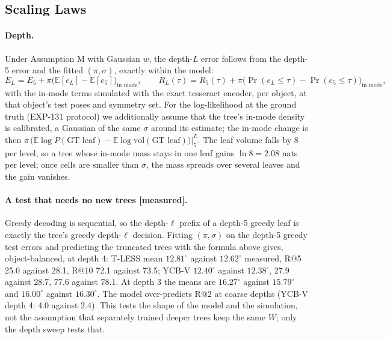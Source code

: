 \subsection{Scaling Laws}
\label{sec:supp_theory_scaling}

\paragraph{Depth.}
Under Assumption M with Gaussian $w$, the depth-$L$ error follows from the depth-5 error and the fitted $(\pi,\sigma)$, exactly
within the model:
\[
E_L=E_5+\pi\big(\mathbb E[e_L]-\mathbb E[e_5]\big)_{\text{in mode}},\qquad
R_L(\tau)=R_5(\tau)+\pi\big(\Pr(e_L\le\tau)-\Pr(e_5\le\tau)\big)_{\text{in mode}},
\]
with the in-mode terms simulated with the exact tesseract encoder, per object, at that object's test poses and symmetry set.
For the log-likelihood at the ground truth (EXP-131 protocol) we additionally assume that the tree's in-mode density is calibrated, a Gaussian of the
same $\sigma$ around its estimate; the in-mode change is then $\pi\,\big(\mathbb E\log P(\text{GT leaf})-\mathbb E\log\mathrm{vol}(\text{GT leaf})\big)\big|^{L}_{5}$.
The leaf volume falls by 8 per level, so a tree whose in-mode mass stays in one leaf gains $\ln8=2.08$ nats per level; once
cells are smaller than $\sigma$, the mass spreads over several leaves and the gain vanishes.

\paragraph{A test that needs no new trees [measured].}
Greedy decoding is sequential, so the depth-$\ell$ prefix of a depth-5 greedy leaf is exactly the tree's greedy depth-$\ell$
decision. Fitting $(\pi,\sigma)$ on the depth-5 greedy test errors and predicting the truncated trees with the formula above gives,
object-balanced, at depth 4: T-LESS mean $12.81^\circ$ against $12.62^\circ$ measured, R@5 25.0 against 28.1, R@10 72.1 against 73.5;
YCB-V $12.40^\circ$ against $12.38^\circ$, 27.9 against 28.7, 77.6 against 78.1. At depth 3 the means are $16.27^\circ$ against
$15.79^\circ$ and $16.00^\circ$ against $16.30^\circ$. The model over-predicts R@2 at coarse depths (YCB-V depth 4: 4.0 against 2.4).
This tests the shape of the model and the simulation, not the assumption that separately trained deeper trees keep the
same $W$; only the depth sweep tests that.


